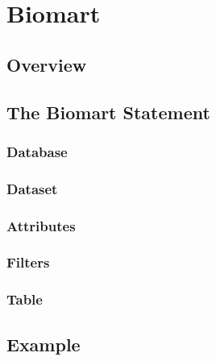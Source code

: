 


\chapter{Biomart}\label{chap:Biomart}


\section{Overview}
\section{The Biomart Statement}
\subsection{Database}
\subsection{Dataset}
\subsection{Attributes}
\subsection{Filters}
\subsection{Table}

\section{Example}
